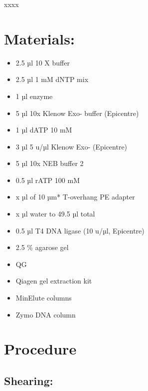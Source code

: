 \documentclass[
  letterpaper,
  DIV=11,
  numbers=noendperiod]{scrreprt}
\providecommand{\tightlist}{%
  \setlength{\itemsep}{0pt}\setlength{\parskip}{0pt}}\usepackage{longtable,booktabs,array}
\begin{document}
\begin{tcolorbox}[enhanced jigsaw, rightrule=.15mm, title=\textcolor{quarto-callout-warning-color}{\faExclamationTriangle}\hspace{0.5em}{NOTES}, titlerule=0mm, opacitybacktitle=0.6, toprule=.15mm, bottomrule=.15mm, opacityback=0, left=2mm, colframe=quarto-callout-warning-color-frame, breakable, coltitle=black, colback=white, colbacktitle=quarto-callout-warning-color!10!white, bottomtitle=1mm, leftrule=.75mm, toptitle=1mm, arc=.35mm]

xxxx

\end{tcolorbox}

\hypertarget{materials-24}{%
\section{Materials:}\label{materials-24}}

\begin{itemize}
\tightlist
\item
  2.5 µl 10 X buffer
\item
  2.5 µl 1 mM dNTP mix
\item
  1 µl enzyme
\item
  5 µl 10x Klenow Exo- buffer (Epicentre)
\item
  1 µl dATP 10 mM
\item
  3 µl 5 u/µl Klenow Exo- (Epicentre)
\item
  5 µl 10x NEB buffer 2
\item
  0.5 µl rATP 100 mM
\item
  x µl of 10 µm* T-overhang PE adapter
\item
  x µl water to 49.5 µl total
\item
  0.5 µl T4 DNA ligase (10 u/µl, Epicentre)
\item
  2.5 \% agarose gel
\item
  QG
\item
  Qiagen gel extraction kit
\item
  MinElute columns
\item
  Zymo DNA column
\end{itemize}

\hypertarget{procedure-23}{%
\section{Procedure}\label{procedure-23}}

\hypertarget{shearing}{%
\subsection{Shearing:}\label{shearing}}
\end{document}

